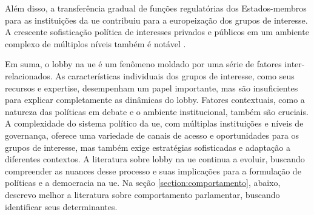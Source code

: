     Além disso, a transferência gradual de funções regulatórias dos Estados-membros para as instituições da \acrshort{ue} contribuiu para a europeização dos grupos de interesse. A crescente sofisticação política de interesses privados e públicos em um ambiente complexo de múltiplos níveis também é notável \cite{richardson2000government, Coen2007}.

Em suma, o lobby na \acrshort{ue} é um fenômeno moldado por uma série de fatores inter-relacionados. As características individuais dos grupos de interesse, como seus recursos e expertise, desempenham um papel importante, mas são insuficientes para explicar completamente as dinâmicas do lobby. Fatores contextuais, como a natureza das políticas em debate e o ambiente institucional, também são cruciais. A complexidade do sistema político da \acrshort{ue}, com múltiplas instituições e níveis de governança, oferece uma variedade de canais de acesso e oportunidades para os grupos de interesse, mas também exige estratégias sofisticadas e adaptação a diferentes contextos. A literatura sobre lobby na \acrshort{ue} continua a evoluir, buscando compreender as nuances desse processo e suas implicações para a formulação de políticas e a democracia na \acrshort{ue}. Na seção \ref{section:comportamento}, abaixo, descrevo melhor a literatura sobre comportamento parlamentar, buscando identificar seus determinantes.